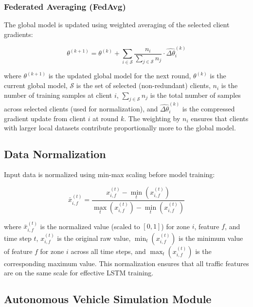 \documentclass[journal]{IEEEtran}
\begin{document}
\subsubsection{Federated Averaging (FedAvg)}
The global model is updated using weighted averaging of the selected client gradients:

\begin{equation}
\theta^{(k+1)} = \theta^{(k)} + \sum_{i \in \mathcal{S}} \frac{n_i}{\sum_{j \in \mathcal{S}} n_j} \cdot \widehat{\Delta\theta}_i^{(k)}
\label{eq:fedavg}
\end{equation}

\noindent where $\theta^{(k+1)}$ is the updated global model for the next round, $\theta^{(k)}$ is the current global model, $\mathcal{S}$ is the set of selected (non-redundant) clients, $n_i$ is the number of training samples at client $i$, $\sum_{j \in \mathcal{S}} n_j$ is the total number of samples across selected clients (used for normalization), and $\widehat{\Delta\theta}_i^{(k)}$ is the compressed gradient update from client $i$ at round $k$. The weighting by $n_i$ ensures that clients with larger local datasets contribute proportionally more to the global model.

\subsection{Data Normalization}

Input data is normalized using min-max scaling before model training:

\begin{equation}
\bar{x}_{i,f}^{(t)} = \frac{x_{i,f}^{(t)} - \min_t(x_{i,f}^{(t)})}{\max_t(x_{i,f}^{(t)}) - \min_t(x_{i,f}^{(t)})}
\label{eq:normalize}
\end{equation}

\noindent where $\bar{x}_{i,f}^{(t)}$ is the normalized value (scaled to $[0, 1]$) for zone $i$, feature $f$, and time step $t$, $x_{i,f}^{(t)}$ is the original raw value, $\min_t(x_{i,f}^{(t)})$ is the minimum value of feature $f$ for zone $i$ across all time steps, and $\max_t(x_{i,f}^{(t)})$ is the corresponding maximum value. This normalization ensures that all traffic features are on the same scale for effective LSTM training.

\subsection{Autonomous Vehicle Simulation Module}
\end{document}

